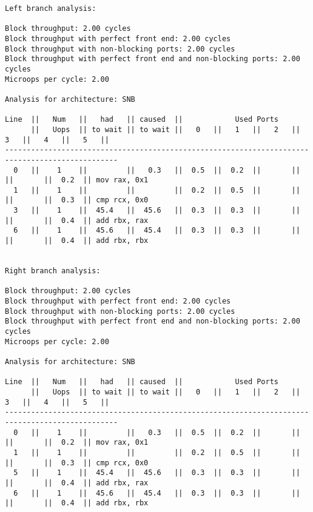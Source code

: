 \documentclass[a4paper,12pt,titlepage, twoside]{report}
\begin{document}
\begin{mdframed}[backgroundcolor=light-gray, roundcorner=10pt,leftmargin=1, rightmargin=1, innerleftmargin=15, innertopmargin=15,innerbottommargin=15, outerlinewidth=1, linecolor=light-gray]
\begin{center}
\begin{BVerbatim}[fontsize=\tiny]
Left branch analysis:

Block throughput: 2.00 cycles
Block throughput with perfect front end: 2.00 cycles
Block throughput with non-blocking ports: 2.00 cycles
Block throughput with perfect front end and non-blocking ports: 2.00 cycles
Microops per cycle: 2.00

Analysis for architecture: SNB

Line  ||   Num   ||   had   || caused  ||            Used Ports
      ||   Uops  || to wait || to wait ||   0   ||   1   ||   2   ||   3   ||   4   ||   5   ||
------------------------------------------------------------------------------------------------
  0   ||    1    ||         ||   0.3   ||  0.5  ||  0.2  ||       ||       ||       ||  0.2  || mov rax, 0x1
  1   ||    1    ||         ||         ||  0.2  ||  0.5  ||       ||       ||       ||  0.3  || cmp rcx, 0x0
  3   ||    1    ||  45.4   ||  45.6   ||  0.3  ||  0.3  ||       ||       ||       ||  0.4  || add rbx, rax
  6   ||    1    ||  45.6   ||  45.4   ||  0.3  ||  0.3  ||       ||       ||       ||  0.4  || add rbx, rbx


Right branch analysis:

Block throughput: 2.00 cycles
Block throughput with perfect front end: 2.00 cycles
Block throughput with non-blocking ports: 2.00 cycles
Block throughput with perfect front end and non-blocking ports: 2.00 cycles
Microops per cycle: 2.00

Analysis for architecture: SNB

Line  ||   Num   ||   had   || caused  ||            Used Ports
      ||   Uops  || to wait || to wait ||   0   ||   1   ||   2   ||   3   ||   4   ||   5   ||
------------------------------------------------------------------------------------------------
  0   ||    1    ||         ||   0.3   ||  0.5  ||  0.2  ||       ||       ||       ||  0.2  || mov rax, 0x1
  1   ||    1    ||         ||         ||  0.2  ||  0.5  ||       ||       ||       ||  0.3  || cmp rcx, 0x0
  5   ||    1    ||  45.4   ||  45.6   ||  0.3  ||  0.3  ||       ||       ||       ||  0.4  || add rbx, rax
  6   ||    1    ||  45.6   ||  45.4   ||  0.3  ||  0.3  ||       ||       ||       ||  0.4  || add rbx, rbx
\end{BVerbatim}
\end{center}
\end{mdframed}
\end{document}

